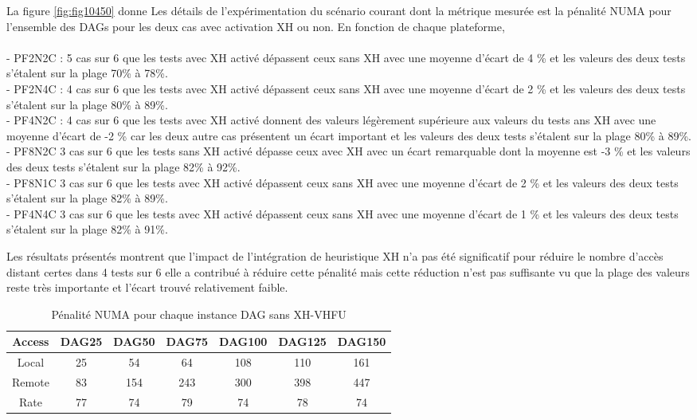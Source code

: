 La figure \ref{fig:fig10450} donne Les détails de l'expérimentation du scénario courant dont la métrique mesurée est la pénalité NUMA pour l'ensemble des DAGs pour les deux cas avec activation XH ou non. En fonction de chaque plateforme, \\
\\
- PF2N2C : 5 cas sur 6 que les tests avec XH activé dépassent ceux sans XH avec une moyenne d'écart de 4 \% et les valeurs des deux tests s'étalent sur la plage 70\% à 78\%.\\
- PF2N4C : 4 cas sur 6 que les tests avec XH activé dépassent ceux sans XH avec une moyenne d'écart de 2 \% et les valeurs des deux tests s'étalent sur la plage 80\% à 89\%.\\
- PF4N2C : 4 cas sur 6 que les tests avec XH activé donnent des valeurs légèrement supérieure aux valeurs du tests ans XH avec une moyenne d'écart de -2 \%  car les deux autre cas présentent un écart important et les valeurs des deux tests s'étalent sur la plage 80\% à 89\%.\\
- PF8N2C 3 cas sur 6 que les tests sans XH activé dépasse ceux avec XH avec un écart remarquable dont la moyenne est -3 \% et les valeurs des deux tests s'étalent sur la plage 82\% à 92\%.\\
- PF8N1C 3 cas sur 6 que les tests avec XH activé dépassent ceux sans XH avec une moyenne d'écart de 2 \% et les valeurs des deux tests s'étalent sur la plage 82\% à 89\%.\\
- PF4N4C 3 cas sur 6 que les tests avec XH activé dépassent ceux sans XH avec une moyenne d'écart de 1 \% et les valeurs des deux tests s'étalent sur la plage 82\% à 91\%.

Les résultats présentés montrent que l'impact de l'intégration de heuristique XH n'a pas été significatif pour réduire le nombre d'accès distant  certes dans 4 tests sur 6 elle a contribué à réduire cette pénalité mais cette réduction n'est pas suffisante vu que la plage des valeurs reste très importante et l'écart trouvé relativement faible. 
%
\begin{table}%
\centering
\begin{tabular}{| c | c | c | c | c | c | c |} 
\hline
Access 		& DAG25 	& DAG50 	& DAG75 	& DAG100 	& DAG125  	& DAG150 \\ [0.5ex] \hline
Local 			& 25 	& 54 		& 64 		& 108 		& 110  		& 161 \\ [0.5ex] \hline
Remote 		& 83 	& 154 		& 243 		& 300 		& 398  		& 447 \\ [0.5ex] \hline
Rate 		& 77 		& 74 		& 79 		& 74 		& 78  		& 74 \\ [0.5ex] \hline
\hline
\end{tabular}
\caption{Pénalité NUMA pour chaque instance DAG sans XH-VHFU}
\label{table:TB_2_2222}
\end{table}

